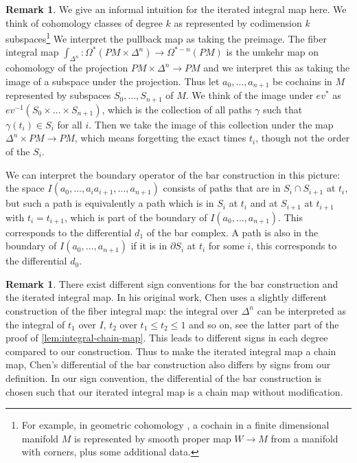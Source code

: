 \documentclass{scrartcl}
\theoremstyle{plain}
\theoremstyle{definition}
\newtheorem{remark}[theorem]{Remark}
\newcommand{\isect}{\mathbin{\cap}}
\begin{document}
\begin{remark}
    We give an informal intuition for the iterated integral map here. We think of cohomology classes of degree $k$ as represented by codimension $k$ subspaces\footnote{For example, in geometric cohomology \cite{friedman2022foundations}, a cochain in a finite dimensional manifold $M$ is represented by smooth proper map $W\to M$ from a manifold with corners, plus some additional data. } We interpret the pullback map as taking the preimage. The fiber integral map $\int_{\Delta^n}\colon \Omega^*(PM\times \Delta^n)\to \Omega^{*-n}(PM)$ is the umkehr map on cohomology of the projection $PM\times \Delta^n\to PM$ and we interpret this as taking the image of a subspace under the projection. Thus let $a_0, \dots, a_{n+1}$ be cochains in $M$ represented by subspaces $S_0, \dots, S_{n+1}$ of $M$. We think of the image under $ev^*$ as $ev^{-1}(S_0\times\dots\times S_{n+1})$, which is the collection of all paths $\gamma$ such that $\gamma(t_i)\in S_i$ for all $i$. Then we take the image of this collection under the map $\Delta^n\times PM \to PM$, which means forgetting the exact times $t_i$, though not the order of the $S_i$. 
    
    We can interpret the boundary operator of the bar construction in this picture: the space $I(a_0, \dots, a_ia_{i+1},\dots, a_{n+1})$ consists of paths that are in $S_i\isect S_{i+1}$ at $t_i$, but such a path is equivalently a path which is in $S_i$ at $t_i$ and at $S_{i+1}$ at $t_{i+1}$ with $t_i=t_{i+1}$, which is part of the boundary of $I(a_0,\dots,a_{n+1})$. This corresponds to the differential $d_1$ of the bar complex. A path is also in the boundary of $I(a_0,\dots,a_{n+1})$ if it is in $\partial S_i$ at $t_i$ for some $i$, this corresponds to the differential $d_0$. 
\end{remark}

\begin{remark}
    There exist different sign conventions for the bar construction and the iterated integral map. In his original work, Chen uses a slightly different construction of the fiber integral map: the integral over $\Delta^n$ can be interpreted as the integral of $t_1$ over $I$, $t_2$ over $t_1\leq t_2\leq 1$ and so on, see the latter part of the proof of \cref{lem:integral-chain-map}. This leads to different signs in each degree compared to our construction. Thus to make the iterated integral map a chain map, Chen's differential of the bar construction also differs by signs from our definition. In our sign convention, the differential of the bar construction is chosen such that our iterated integral map is a chain map without modification.
\end{remark}
\end{document}
